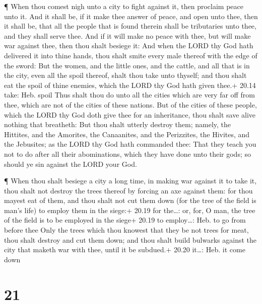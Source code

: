  ¶ When thou comest nigh unto a city to fight against it,
then proclaim peace unto it.  And it shall be, if it make
thee answer of peace, and open unto thee, then it shall be, that all the
people that is found therein shall be tributaries unto thee, and they
shall serve thee.  And if it will make no peace with thee,
but will make war against thee, then thou shalt besiege it:
 And when the LORD thy God hath delivered it into thine
hands, thou shalt smite every male thereof with the edge of the sword:
 But the women, and the little ones, and the cattle, and
all that is in the city, even all the spoil thereof, shalt thou take
unto thyself; and thou shalt eat the spoil of thine enemies, which the
LORD thy God hath given thee.+ 20.14 take: Heb. spoil  Thus
shalt thou do unto all the cities which are very far off from thee,
which are not of the cities of these nations.  But of the
cities of these people, which the LORD thy God doth give thee for an
inheritance, thou shalt save alive nothing that breatheth: 
But thou shalt utterly destroy them; namely, the Hittites, and the
Amorites, the Canaanites, and the Perizzites, the Hivites, and the
Jebusites; as the LORD thy God hath commanded thee:  That
they teach you not to do after all their abominations, which they have
done unto their gods; so should ye sin against the LORD your God.

 ¶ When thou shalt besiege a city a long time, in making
war against it to take it, thou shalt not destroy the trees thereof by
forcing an axe against them: for thou mayest eat of them, and thou shalt
not cut them down (for the tree of the field is man's life) to employ
them in the siege:+ 20.19 for the\ldots: or, for, O man, the tree of the
field is to be employed in the siege+ 20.19 to employ\ldots: Heb. to go
from before thee  Only the trees which thou knowest that
they be not trees for meat, thou shalt destroy and cut them down; and
thou shalt build bulwarks against the city that maketh war with thee,
until it be subdued.+ 20.20 it\ldots: Heb. it come down

\hypertarget{section-20}{%
\section{21}\label{section-20}}

